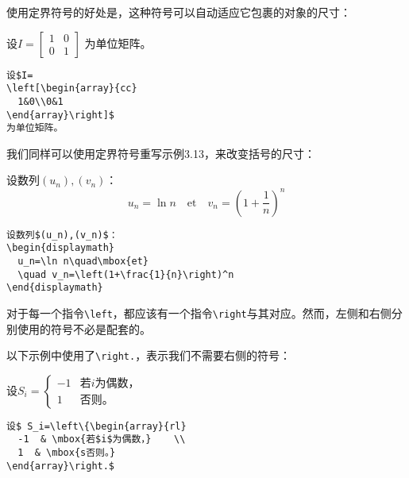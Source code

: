 使用定界符号的好处是，这种符号可以自动适应它包裹的对象的尺寸：

\begin{codelist}[3.16]{
  设$I=
\left[\begin{array}{cc}
  1&0\\0&1
\end{array}\right]$
为单位矩阵。
}
\begin{verbatim}
设$I=
\left[\begin{array}{cc}
  1&0\\0&1
\end{array}\right]$
为单位矩阵。\end{verbatim}
\end{codelist}

我们同样可以使用定界符号重写示例3.13，来改变括号的尺寸：

\begin{codelist}[3.17]{
  设数列$(u_n),(v_n)$：
\begin{displaymath}
  u_n=\ln n\quad\mbox{et}
  \quad v_n=\left(1+\frac{1}{n}\right)^n
\end{displaymath}
}
\begin{verbatim}
设数列$(u_n),(v_n)$：
\begin{displaymath}
  u_n=\ln n\quad\mbox{et}
  \quad v_n=\left(1+\frac{1}{n}\right)^n
\end{displaymath}\end{verbatim}
\end{codelist}

\begin{exclamation}
对于每一个指令\verb|\left|，都应该有一个指令\verb|\right|与其对应。然而，左侧和右侧分别使用的符号不必是配套的。
\end{exclamation}

以下示例中使用了\verb|\right.|，表示我们不需要右侧的符号：

\begin{codelist}[3.18]{
  设$ S_i=\left\{\begin{array}{rl}
    -1  & \mbox{若$i$为偶数，}    \\
    1  & \mbox{否则。}
  \end{array}\right.$
}
\begin{verbatim}
设$ S_i=\left\{\begin{array}{rl}
  -1  & \mbox{若$i$为偶数，}    \\
  1  & \mbox{s否则。}
\end{array}\right.$\end{verbatim}
\end{codelist}

